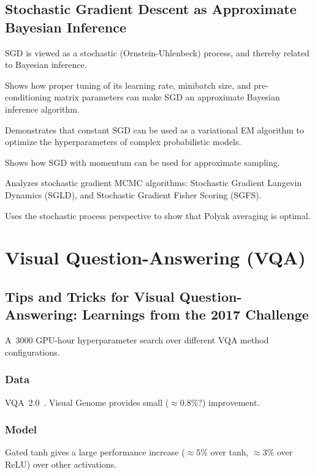 \documentclass[a4paper, 12pt]{article}
\begin{document}
\subsection{Stochastic Gradient Descent as Approximate Bayesian
            Inference~\citet{mandt-sgd-2017}}

SGD is viewed as a stochastic (Ornstein-Uhlenbeck) process, and thereby related
to Bayesian inference.

Shows how proper tuning of its learning rate, minibatch size, and
pre-conditioning matrix parameters can make SGD an approximate Bayesian
inference algorithm.

Demonstrates that constant SGD can be used as a variational EM algorithm to
optimize the hyperparameters of complex probabilistic models.

Shows how SGD with momentum can be used for approximate sampling.

Analyzes stochastic gradient MCMC algorithms: Stochastic Gradient Langevin
Dynamics (SGLD), and Stochastic Gradient Fisher Scoring (SGFS).

Uses the stochastic process perspective to show that Polyak averaging is
optimal.


\section{Visual Question-Answering (VQA)}

\subsection{Tips and Tricks for Visual Question-Answering: Learnings from the
            2017 Challenge}

A~\num{3000} GPU-hour hyperparameter search over different VQA method
configurations.


\subsubsection{Data}

VQA~2.0~\citet{goyal2017making}. Visual Genome provides small
($\approx 0.8\%$?) improvement.


\subsubsection{Model}

Gated tanh gives a large performance increase ($\approx 5\%$ over tanh,
$\approx 3\%$ over ReLU) over other activations.
\end{document}
